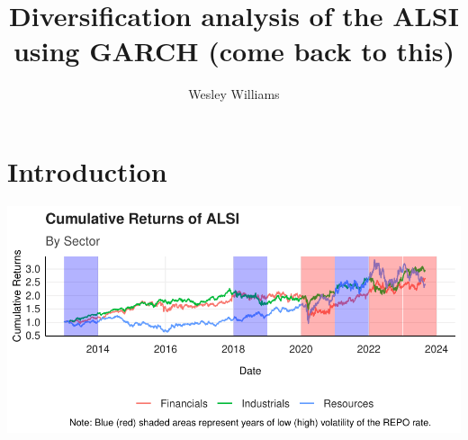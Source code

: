 \documentclass[11pt,preprint, authoryear]{elsarticle}
\let\origfigure\figure
\let\endorigfigure\endfigure
\renewenvironment{figure}[1][2] {
    \expandafter\origfigure\expandafter[H]
} {
    \endorigfigure
}
\numberwithin{equation}{section}
\numberwithin{figure}{section}
\numberwithin{table}{section}
\begin{document}
\begin{frontmatter}  %

\title{Diversification analysis of the ALSI using GARCH (come back to
this)}





\author[Add1]{Wesley Williams}





\address[Add1]{Stellenosch University, South Africa}



\vspace{1cm}





\vspace{0.5cm}

\end{frontmatter}

\setcounter{footnote}{0}



\pagestyle{fancy}
\chead{}
\rhead{}
\lfoot{}
\lhead{}
\cfoot{}


\headsep 35pt %




\hypertarget{introduction}{%
\section{\texorpdfstring{Introduction
\label{Introduction}}{Introduction }}\label{introduction}}

\begin{figure}[H]

{\centering \includegraphics{WriteUp_files/figure-latex/Figure1-1} 

}

\caption{Cumulative Returns of ALSI \label{Figure1}}\label{fig:Figure1}
\end{figure}
\end{document}
